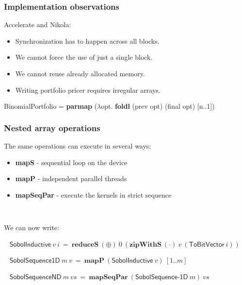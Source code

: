 \documentclass{beamer}
\begin{document}
\begin{frame}
  \frametitle{Implementation observations}

  Accelerate and Nikola:
  \begin{itemize}
  \item Synchronization has to happen across all blocks.
  \item We cannot force the use of just a single block.
  \item We cannot reuse already allocated memory.
  \item Writing portfolio pricer requires irregular arrays.
  \end{itemize}

  \pause
  \vspace{4mm}
  \begin{center}
    BinomialPortfolio = \textbf{parmap} ($\lambda$opt. \textbf{foldl} (prev opt) (final opt) [n..1])
  \end{center}

\end{frame}




\begin{frame}
  \frametitle{Nested array operations}

  The same operations can execute in several ways:

  \begin{itemize}
  \item \textbf{mapS} - sequential loop on the device
  \item \textbf{mapP} - independent parallel threads
  \item \textbf{mapSeqPar} - execute the kernels in strict sequence
  \end{itemize}
  ~\vspace{2mm}\pause

  We can now write:

  ~\vspace{2mm}
  $\mathsf{SobolInductive}~v~i~=~\textbf{reduceS}~(\oplus)~0~(\textbf{zipWithS}~(\cdot)~v~(\textsf{ToBitVector}~i))$
  
  ~\vspace{2mm}
  $\mathsf{SobolSequence1D}~m~v~=~\textbf{mapP}~(\textsf{SobolInductive}~v)~[1..m]$
  
  ~\vspace{2mm}
  $\mathsf{SobolSequenceND}~m~vs~=~\textbf{mapSeqPar}~(\textsf{SobolSequence-1D}~m)~vs$

\end{frame}
\end{document}
